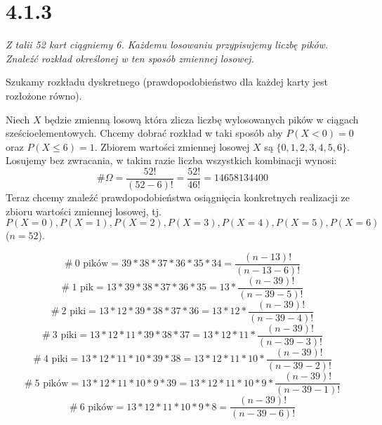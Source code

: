 \documentclass{article}
\begin{document}
\section{4.1.3}

\begin{center}
    \emph{Z talii 52 kart ciągniemy 6. Każdemu losowaniu przypisujemy liczbę pików. Znaleźć rozkład określonej w ten sposób
zmiennej losowej.}
\end{center}


Szukamy rozkładu dyskretnego (prawdopodobieństwo dla każdej karty jest rozłożone równo).\par 
Niech \(X\) będzie zmienną losową która zlicza liczbę wylosowanych pików w ciągach sześcioelementowych.
Chcemy dobrać rozkład w taki sposób aby \(P(X < 0) = 0\) oraz \(P(X \leq 6 ) = 1\). Zbiorem wartości
zmiennej losowej \(X\) są \(\{0, 1, 2, 3, 4, 5, 6\}\). Losujemy bez zwracania, w takim razie liczba wszystkich
kombinacji wynosi:
\begin{equation*}
    \# \Omega = \frac{52!}{(52 - 6)!} = \frac{52!}{46!} = 14658134400 
\end{equation*}
Teraz chcemy znaleźć prawdopodobieństwa osiągnięcia konkretnych realizacji ze zbioru wartości zmiennej losowej, tj.
\(P(X = 0), P(X = 1), P(X = 2), P(X = 3), P(X = 4), P(X = 5), P(X = 6) \) (\(n = 52\)).

\begin{equation*}
    \# \ \mbox{0 pików} = 39 * 38 * 37 * 36 * 35 * 34 = \frac{(n - 13)!}{(n - 13 - 6)!}
\end{equation*}
\begin{equation*}
    \# \ \mbox{1 pik} = 13 * 39 * 38 * 37 * 36 * 35 = 13 * \frac{(n - 39)!}{(n - 39 - 5)!}
\end{equation*}
\begin{equation*}
    \# \ \mbox{2 piki} = 13 * 12 * 39 * 38 * 37 * 36 = 13 * 12 * \frac{(n - 39)!}{(n - 39 - 4)!}
\end{equation*}
\begin{equation*}
    \# \ \mbox{3 piki} = 13 * 12 * 11 * 39 * 38 * 37 = 13 * 12 * 11 * \frac{(n - 39)!}{(n - 39 - 3)!}
\end{equation*}
\begin{equation*}
    \# \ \mbox{4 piki} = 13 * 12 * 11 * 10 * 39 * 38 =  13 * 12 * 11 * 10 * \frac{(n - 39)!}{(n - 39 - 2)!}
\end{equation*}
\begin{equation*}
    \# \ \mbox{5 pików} = 13 * 12 * 11 * 10 * 9 * 39 = 13 * 12 * 11 * 10 * 9 * \frac{(n - 39)!}{(n - 39 - 1)!}
\end{equation*}
\begin{equation*}
    \# \ \mbox{6 pików} = 13 * 12 * 11 * 10 * 9 * 8 = \frac{(n - 39)!}{(n - 39 - 6)!}
\end{equation*}

\end{document}
